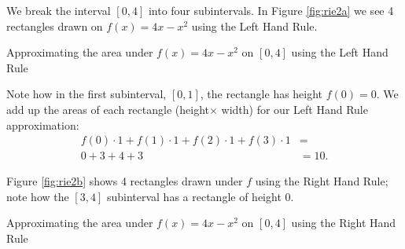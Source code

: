 \begin{solution} 
 We break the interval $[0,4]$ into four subintervals. In Figure \ref{fig:rie2a} we see 4 rectangles drawn on $f(x) = 4x-x^2$ using the Left Hand Rule. 

\begin{minipage}[t]{\linewidth}
\begin{center}
\caption{Approximating the area under $f(x)= 4x-x^2$ on $ [0,4] $ using the Left Hand Rule \label{fig:rie2a}}
\end{center}
\end{minipage}

\noindent Note how in the first subinterval, $[0,1]$, the rectangle has height $f(0)=0$. We add up the areas of each rectangle (height$\times$ width) for our Left Hand Rule approximation:
	\begin{align*} f(0)\cdot 1 + f(1)\cdot 1+ f(2)\cdot 1+f(3)\cdot 1 &=\\
	0+3+4+3&= 10.
	\end{align*}
	
Figure \ref{fig:rie2b} shows 4 rectangles drawn under $f$ using the Right Hand Rule; note how the $[3,4]$ subinterval has a rectangle of height 0. 

\begin{minipage}[t]{\linewidth}
\begin{center}
\caption{Approximating the area under $f(x)= 4x-x^2$ on $ [0,4] $ using the Right Hand Rule \label{fig:rie2b}}
\end{center}
\end{minipage}


\end{solution}
